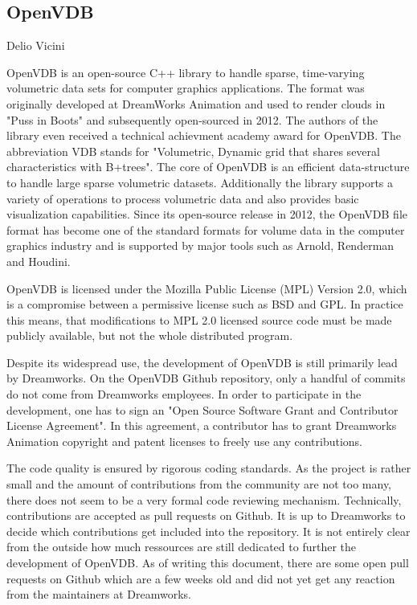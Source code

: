 \subsection{OpenVDB}{Delio Vicini}

OpenVDB is an open-source C++ library to handle sparse, time-varying volumetric data sets for computer graphics applications. The format was originally developed at DreamWorks Animation and used to render clouds in "Puss in Boots" and subsequently open-sourced in 2012.\cite{Museth.2013} The authors of the library even received a technical achievment academy award for OpenVDB.\cite{openvdb-about} The abbreviation VDB stands for "Volumetric, Dynamic grid that
shares several characteristics with B+trees".\cite{Museth.2013} The core of OpenVDB is an efficient data-structure to handle large sparse volumetric datasets. Additionally the library supports a variety of operations to process volumetric data and also provides basic visualization capabilities. Since its open-source release in 2012, the OpenVDB file format has become one of the standard formats for volume data in the computer graphics industry and is supported by major tools such as Arnold, Renderman and Houdini.\cite{openvdb-about}


OpenVDB is licensed under the Mozilla Public License (MPL) Version 2.0, which is a compromise between a permissive license such as BSD and GPL. In practice this means, that modifications to MPL 2.0 licensed source code must be made publicly available, but not the whole distributed program.\cite{mpl-faq}

Despite its widespread use, the development of OpenVDB is still primarily lead by Dreamworks. On the OpenVDB Github repository, only a handful of commits do not come from Dreamworks employees.\cite{openvdb-contribs} In order to participate in the development, one has to sign an "Open Source Software Grant and Contributor License Agreement".\cite{openvdb-agree} In this agreement, a contributor has to grant Dreamworks Animation copyright and patent licenses to freely use any contributions. 


The code quality is ensured by rigorous coding standards.\cite{openvdb-code} As the project is rather small and the amount of contributions from the community are not too many, there does not seem to be a very formal code reviewing mechanism. Technically, contributions are accepted as pull requests on Github. It is up to Dreamworks to decide which contributions get included into the repository. It is not entirely clear from the outside how much ressources are still dedicated to further the development of OpenVDB. As of writing this document, there are some open pull requests on Github which are a few weeks old and did not yet get any reaction from the maintainers at Dreamworks.


